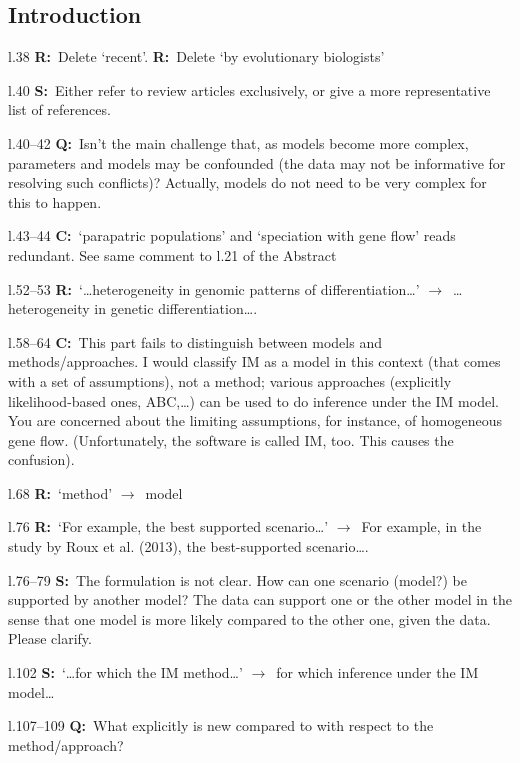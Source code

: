 \documentclass[11pt]{article}
\newenvironment{my_description}
{\begin{description}
  \setlength{\itemsep}{2pt}
  \setlength{\parskip}{0pt}
  \setlength{\parsep}{0pt}}
{\end{description}}
\newcommand{\ra}{$\rightarrow$\ }
\newcommand{\C}{\textbf{C:}\ }
\newcommand{\Q}{\textbf{Q:}\ }
\newcommand{\R}{\textbf{R:}\ }
\newcommand{\V}{\textbf{S:}\ }
\begin{document}
\subsection{Introduction}
\begin{my_description}
	\item[l.38] \R Delete `recent'. \R Delete `by evolutionary biologists'
	\item[l.40] \V Either refer to review articles exclusively, or give a more representative list of references.
	\item[l.40--42] \Q Isn't the main challenge that, as models become more complex, parameters and models may be confounded (the data may not be informative for resolving such conflicts)? Actually, models do not need to be very complex for this to happen.
	\item[l.43--44] \C `parapatric populations' and `speciation with gene flow' reads redundant. See same comment to l.21 of the Abstract
	\item[l.52--53] \R `\dots heterogeneity in genomic patterns of differentiation\dots' \ra \dots heterogeneity in genetic differentiation\dots.
	\item[l.58--64] \C This part fails to distinguish between models and methods/approaches. I would classify IM as a model in this context (that comes with a set of assumptions), not a method; various approaches (explicitly likelihood-based ones, ABC,\dots) can be used to do inference under the IM model. You are concerned about the limiting assumptions, for instance, of homogeneous gene flow. (Unfortunately, the software is called IM, too. This causes the confusion).
	\item[l.68] \R `method' \ra model
	\item[l.76] \R `For example, the best supported scenario\dots' \ra For example, in the study by Roux et al. (2013), the best-supported scenario\dots.
	\item[l.76--79] \V The formulation is not clear. How can one scenario (model?) be supported by another model? The data can support one or the other model in the sense that one model is more likely compared to the other one, given the data. Please clarify.
	\item[l.102] \V `\dots for which the IM method\dots' \ra for which inference under the IM model\dots
	\item[l.107--109] \Q What explicitly is new compared to \citet{Roux:2013fk} with respect to the method/approach?

\end{my_description}
\end{document}
